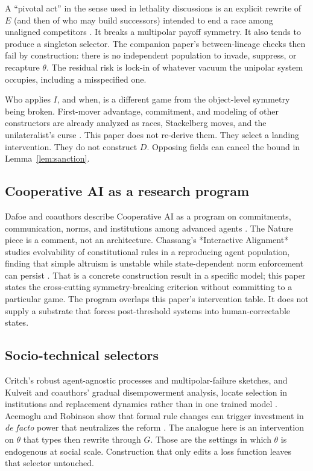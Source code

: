 \documentclass[11pt]{article}
\begin{document}
A ``pivotal act'' in the sense used in lethality discussions is an explicit rewrite of \(E\) (and then of who may build successors) intended to end a race among unaligned competitors \parencite{yudkowsky2022}. It breaks a multipolar payoff symmetry. It also tends to produce a singleton selector. The companion paper's between-lineage checks then fail by construction: there is no independent population to invade, suppress, or recapture \(\theta\). The residual risk is lock-in of whatever vacuum the unipolar system occupies, including a misspecified one.

Who applies \(I\), and when, is a different game from the object-level symmetry being broken. First-mover advantage, commitment, and modeling of other constructors are already analyzed as races, Stackelberg moves, and the unilateralist's curse \parencite{schelling1960,armstrong2016,bostrom2014,bostrom2016curse}. This paper does not re-derive them. They select a landing intervention. They do not construct \(D\). Opposing fields can cancel the bound in Lemma~\ref{lem:sanction}.

\subsection{Cooperative AI as a research program}

Dafoe and coauthors describe Cooperative AI as a program on commitments, communication, norms, and institutions among advanced agents \parencite{dafoe2020coop,dafoe2021}. The Nature piece is a comment, not an architecture. 
Chassang's *Interactive Alignment* studies evolvability of constitutional rules in a reproducing agent population, finding that simple altruism is unstable while state-dependent norm enforcement can persist \parencite{chassang2026}. 
That is a concrete construction result in a specific model; this paper states the cross-cutting symmetry-breaking criterion without committing to a particular game. 
The program overlaps this paper's intervention table. 
It does not supply a substrate that forces post-threshold systems into human-correctable states.

\subsection{Socio-technical selectors}

Critch's robust agent-agnostic processes and multipolar-failure sketches, and Kulveit and coauthors' gradual disempowerment analysis, locate selection in institutions and replacement dynamics rather than in one trained model \parencite{critch2020ai,critch2021multipolar,kulveit2025gradual}. 
Acemoglu and Robinson show that formal rule changes can trigger investment in \emph{de facto} power that neutralizes the reform \parencite{acemoglu2008}. 
The analogue here is an intervention on \(\theta\) that types then rewrite through \(G\). 
Those are the settings in which \(\theta\) is endogenous at social scale. 
Construction that only edits a loss function leaves that selector untouched.
\end{document}
